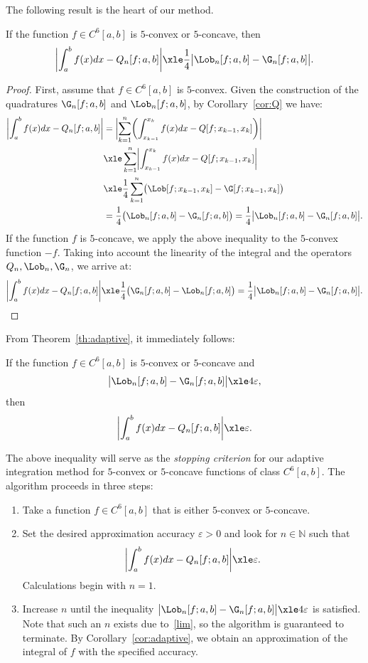 \documentclass[12pt]{amsart}
\theoremstyle{definition}
\begin{document}
The following result is the heart of our method.

\begin{thm}\label{th:adaptive}
 If the function $f\in C^6[a,b]$ is $5$-convex or $5$-concave, then
 \[
  \biggl|
   \int_a^b f(x) dx - Q_n[f;a,b]
  \biggr| \xle
  \frac{1}{4}\bigl|\Lob_n[f;a,b] - \G_n[f;a,b] \bigr|.
 \]
\end{thm}
\begin{proof}
 First, assume that $f\in C^6[a,b]$ is $5$-convex. Given the construction of the quadratures $\G_n[f;a,b]$ and $\Lob_n[f;a,b]$, by Corollary~\ref{cor:Q} we have:
 \begin{align*}
  \biggl| \int_a^b f(x) dx - Q_n[f;a,b] \biggr| &=
  \biggl| \sum_{k=1}^n\biggl( \int_{x_{k-1}}^{x_k} f(x) dx - Q[f;x_{k-1},x_k]\biggr)\biggr|\\
  &\xle \sum_{k=1}^n \biggl| \int_{x_{k-1}}^{x_k} f(x) dx - Q[f;x_{k-1},x_k]\biggr|\\
  &\xle \frac{1}{4}\sum_{k=1}^n\bigl(\Lob[f;x_{k-1},x_k]-\G[f;x_{k-1},x_k]\bigr)\\
  &=\frac{1}{4}\bigl(\Lob_n[f;a,b]-\G_n[f;a,b]\bigr)
  =\frac{1}{4}\bigl|\Lob_n[f;a,b] - \G_n[f;a,b] \bigr|.
 \end{align*}
 If the function $f$ is $5$-concave, we apply the above inequality to the $5$-convex function $-f$. Taking into account the linearity of the integral and the operators $Q_n, \Lob_n, \G_n$, we arrive at:
 \[
  \biggl| \int_a^b f(x) dx - Q_n[f;a,b] \biggr| \xle \frac{1}{4}\bigl(\G_n[f;a,b]-\Lob_n[f;a,b]\bigr)=\frac{1}{4}\bigl|\Lob_n[f;a,b] - \G_n[f;a,b] \bigr|.
 \]
\end{proof}

From Theorem~\ref{th:adaptive}, it immediately follows:
\begin{cor}\label{cor:adaptive}
 If the function $f\in C^6[a,b]$ is $5$-convex or $5$-concave and
 \[
  \bigl|\Lob_n[f;a,b]-\G_n[f;a,b]\bigr| \xle 4\varepsilon,
 \]
 then
 \[
  \biggl|\int_a^b f(x) dx - Q_n[f;a,b]\biggr| \xle \varepsilon.
 \]
\end{cor}

The above inequality will serve as the \emph{stopping criterion} for our adaptive integration method for $5$-convex or $5$-concave functions of class $C^6[a,b]$. The algorithm proceeds in three steps:

\begin{enumerate}[1.]
 \item
  Take a function $f\in C^6[a,b]$ that is either $5$-convex or $5$-concave.
 \item
  Set the desired approximation accuracy $\varepsilon > 0$ and look for $n\in\mathbb{N}$ such that
  \[
   \biggl|\int_a^b f(x) dx - Q_n[f;a,b]\biggr| \xle \varepsilon.
  \] 
  Calculations begin with $n=1$.
 \item
  Increase $n$ until the inequality $\bigl|\Lob_n[f;a,b]-\G_n[f;a,b]\bigr| \xle 4\varepsilon$ is satisfied. Note that such an $n$ exists due to~\eqref{lim}, so the algorithm is guaranteed to terminate. By Corollary~\ref{cor:adaptive}, we obtain an approximation of the integral of $f$ with the specified accuracy.
\end{enumerate}
\end{document}
